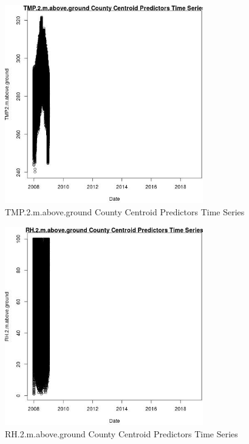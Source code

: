 \begin{figure} 
\centering  
\includegraphics[width=0.77\textwidth]{Code_Outputs/df_report_ML_predictors_CountyCentroid_Locations_Dates_2008-01-01to2018-12-31_TMP2mabovegroundvDate.jpg} 
\caption{\label{fig:df_report_ML_predictors_CountyCentroid_Locations_Dates_2008-01-01to2018-12-31TMP2mabovegroundvDate}TMP.2.m.above.ground County Centroid Predictors Time Series} 
\end{figure} 
 

\clearpage 

\begin{figure} 
\centering  
\includegraphics[width=0.77\textwidth]{Code_Outputs/df_report_ML_predictors_CountyCentroid_Locations_Dates_2008-01-01to2018-12-31_RH2mabovegroundvDate.jpg} 
\caption{\label{fig:df_report_ML_predictors_CountyCentroid_Locations_Dates_2008-01-01to2018-12-31RH2mabovegroundvDate}RH.2.m.above.ground County Centroid Predictors Time Series} 
\end{figure} 
 

